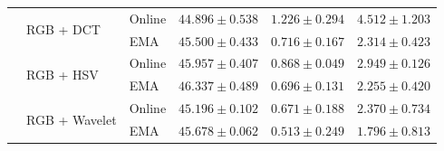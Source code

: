 \begin{table}[htbp]
\begin{tabular}{lllccc}
\addlinespace[2pt]
 & \multirow{2}{*}{RGB + DCT} & Online & $44.896 \pm 0.538$ & $1.226 \pm 0.294$ & $4.512 \pm 1.203$ \\
 &  & EMA & $45.500 \pm 0.433$ & $0.716 \pm 0.167$ & $2.314 \pm 0.423$ \\
\addlinespace[2pt]
 & \multirow{2}{*}{RGB + HSV} & Online & $45.957 \pm 0.407$ & $0.868 \pm 0.049$ & $2.949 \pm 0.126$ \\
 &  & EMA & $46.337 \pm 0.489$ & $0.696 \pm 0.131$ & $2.255 \pm 0.420$ \\
\addlinespace[2pt]
 & \multirow{2}{*}{RGB + Wavelet} & Online & $45.196 \pm 0.102$ & $0.671 \pm 0.188$ & $2.370 \pm 0.734$ \\
 &  & EMA & $45.678 \pm 0.062$ & $0.513 \pm 0.249$ & $1.796 \pm 0.813$ \\
\bottomrule
\end{tabular}
\end{table}